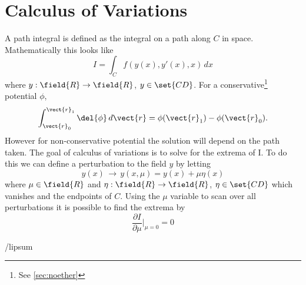 \chapter{Calculus of Variations}
%

A path integral is defined as the integral on a path along $C$ in space.
Mathematically this looks like
\begin{equation}
	I = \int_C f(y(x), y'(x), x) \, dx 
\end{equation}
where $y:\field{R} \rightarrow \field{R}$, $y \in \set{CD} $.
For a conservative\footnote{See \vref{sec:noether}} potential $\phi$, 
\begin{equation}
	\int^{\vect{r}_1}_{\vect{r}_0} \del{\phi} \, d\vect{r} = \phi(\vect{r}_1) -\phi(\vect{r}_0) .
\end{equation}
However for non-conservative potential the solution will depend on the path taken.
The goal of calculus of variations is to solve for the extrema of I.
To do this we can define a perturbation to the field $y$ by letting 
\begin{equation}
	y(x) \, \rightarrow \, y(x,\mu) = y(x) + \mu \eta(x) 
\end{equation}
where $\mu \in \field{R}$ and $\eta:\field{R} \rightarrow \field{R}$, $\eta \in \set{CD}$ which vanishes and the endpoints of $C$.
Using the $\mu$ variable to scan over all perturbations it is possible to find the extrema by
\begin{equation}
	\frac{\partial{I}}{\partial{\mu}}\vert_{\mu = 0} = 0
\end{equation}



/lipsum

